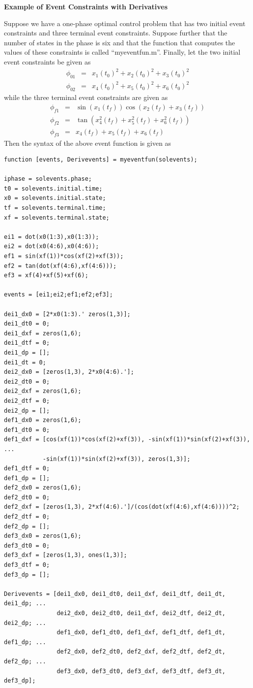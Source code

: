 \documentclass[10pt]{article}
\newenvironment{shadedframe}{%
  \def\FrameCommand{\fcolorbox{black}{shadecolor}}%
  \MakeFramed {\FrameRestore}}
{\endMakeFramed}
\begin{document}
\scriptsize
\begin{shadedframe}
{\noindent}{\bf Example of Event Constraints with Derivatives}
\vspace{12pt}

{\noindent}Suppose we have a one-phase optimal control problem that has two
initial event constraints and three terminal event constraints.  Suppose
further that the number of states in the phase is six and that the function
that computes the values of these constraints is called ``myeventfun.m''.
Finally, let the two initial event constraints be given as
\begin{displaymath}
  \begin{array}{lcl}
    \phi_{01} & = & x_1(t_0)^2+x_2(t_0)^2+x_3(t_0)^2 \\
    \phi_{02} & = & x_4(t_0)^2+x_5(t_0)^2+x_6(t_0)^2
  \end{array}
\end{displaymath}
while the three terminal event constraints are given as
\begin{displaymath}
  \begin{array}{lcl}
    \phi_{f1} & = & \sin(x_1(t_f))\cos(x_2(t_f)+x_3(t_f)) \\
    \phi_{f2} & = & \tan(x_4^2(t_f)+x_5^2(t_f)+x_6^2(t_f)) \\
    \phi_{f3} & = & x_4(t_f)+x_5(t_f)+x_6(t_f)
  \end{array}
\end{displaymath}
Then the syntax of the above event function is given as
\begin{verbatim}
function [events, Derivevents] = myeventfun(solevents);

iphase = solevents.phase;
t0 = solevents.initial.time;
x0 = solevents.initial.state;
tf = solevents.terminal.time;
xf = solevents.terminal.state;

ei1 = dot(x0(1:3),x0(1:3));
ei2 = dot(x0(4:6),x0(4:6));
ef1 = sin(xf(1))*cos(xf(2)+xf(3));
ef2 = tan(dot(xf(4:6),xf(4:6)));
ef3 = xf(4)+xf(5)+xf(6);

events = [ei1;ei2;ef1;ef2;ef3];

dei1_dx0 = [2*x0(1:3).' zeros(1,3)];
dei1_dt0 = 0;
dei1_dxf = zeros(1,6);
dei1_dtf = 0;
dei1_dp = [];
dei1_dt = 0;
dei2_dx0 = [zeros(1,3), 2*x0(4:6).'];
dei2_dt0 = 0;
dei2_dxf = zeros(1,6);
dei2_dtf = 0;
dei2_dp = [];
def1_dx0 = zeros(1,6);
def1_dt0 = 0;
def1_dxf = [cos(xf(1))*cos(xf(2)+xf(3)), -sin(xf(1))*sin(xf(2)+xf(3)), ...
           -sin(xf(1))*sin(xf(2)+xf(3)), zeros(1,3)];
def1_dtf = 0;
def1_dp = [];
def2_dx0 = zeros(1,6);
def2_dt0 = 0;
def2_dxf = [zeros(1,3), 2*xf(4:6).']/(cos(dot(xf(4:6),xf(4:6))))^2;
def2_dtf = 0;
def2_dp = [];
def3_dx0 = zeros(1,6);
def3_dt0 = 0;
def3_dxf = [zeros(1,3), ones(1,3)];
def3_dtf = 0;
def3_dp = [];

Derivevents = [dei1_dx0, dei1_dt0, dei1_dxf, dei1_dtf, dei1_dt, dei1_dp; ...
               dei2_dx0, dei2_dt0, dei1_dxf, dei2_dtf, dei2_dt, dei2_dp; ...
               def1_dx0, def1_dt0, def1_dxf, def1_dtf, def1_dt, def1_dp; ...
               def2_dx0, def2_dt0, def2_dxf, def2_dtf, def2_dt, def2_dp; ...
               def3_dx0, def3_dt0, def3_dxf, def3_dtf, def3_dt, def3_dp];
\end{verbatim}
\end{shadedframe}
\end{document}

